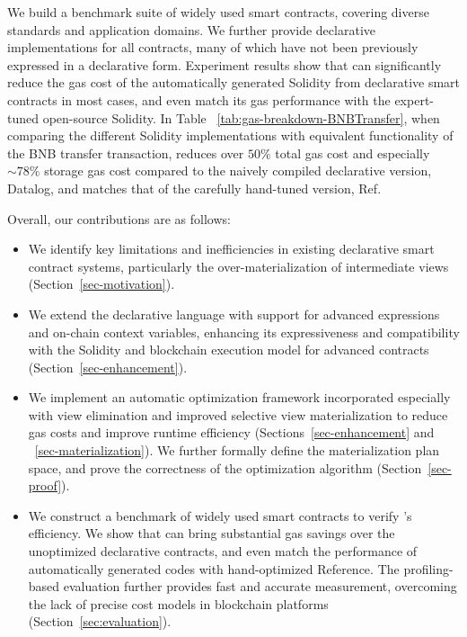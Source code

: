 We build a benchmark suite of widely used smart contracts, covering diverse standards and application domains. We further provide declarative implementations for all contracts, many of which have not been previously expressed in a declarative form.
Experiment results show that \proto can significantly reduce the gas cost of the automatically generated Solidity from declarative smart contracts in most cases, and even match its gas performance with the expert-tuned open-source Solidity. 
In Table ~\ref{tab:gas-breakdown-BNBTransfer}, when comparing the different Solidity implementations with equivalent functionality of the {\sf BNB} transfer transaction, \proto reduces over $50\%$ total gas cost and especially $\sim 78\%$ storage gas cost compared to the naively compiled declarative version, {\sf Datalog}, and matches that of the carefully hand-tuned version, {\sf Ref}.

Overall, our contributions are as follows:
\begin{itemize}[leftmargin=10pt] \item We identify key limitations and inefficiencies in existing declarative smart contract systems, particularly the over-materialization of intermediate views (Section~\ref{sec-motivation}).

\item We extend the declarative language with support for advanced expressions and on-chain context variables, enhancing its expressiveness and compatibility with the Solidity and blockchain execution model for advanced contracts (Section~\ref{sec-enhancement}).

\item We implement an automatic optimization framework incorporated especially with view elimination and improved selective view materialization to reduce gas costs and improve runtime efficiency (Sections~\ref{sec-enhancement} and ~\ref{sec-materialization}).
We further formally define the materialization plan space, and prove the correctness of the optimization algorithm (Section~\ref{sec-proof}).

\item We construct a benchmark of widely used smart contracts to verify \proto's efficiency. We show that \proto can bring substantial gas savings over the unoptimized declarative contracts, and even match the performance of automatically generated codes with hand-optimized Reference. The profiling-based evaluation further provides fast and accurate measurement, overcoming the lack of precise cost models in blockchain platforms (Section~\ref{sec:evaluation}).

\end{itemize}